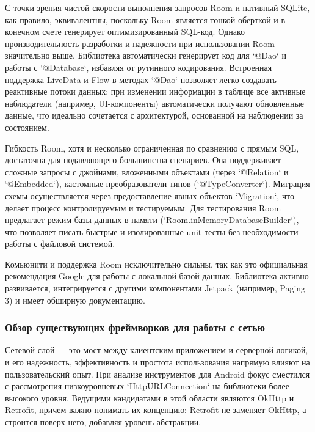 С точки зрения чистой скорости выполнения запросов Room и нативный SQLite, как правило, эквивалентны, поскольку Room является тонкой оберткой и в конечном счете генерирует оптимизированный SQL-код. Однако производительность разработки и надежности при использовании Room значительно выше. Библиотека автоматически генерирует код для `@Dao` и работы с `@Database`, избавляя от рутинного кодирования. Встроенная поддержка LiveData и Flow в методах `@Dao` позволяет легко создавать реактивные потоки данных: при изменении информации в таблице все активные наблюдатели (например, UI-компоненты) автоматически получают обновленные данные, что идеально сочетается с архитектурой, основанной на наблюдении за состоянием. \cite{reff}

Гибкость Room, хотя и несколько ограниченная по сравнению с прямым SQL, достаточна для подавляющего большинства сценариев. Она поддерживает сложные запросы с джойнами, вложенными объектами (через `@Relation` и `@Embedded`), кастомные преобразователи типов (`@TypeConverter`). Миграция схемы осуществляется через предоставление явных объектов `Migration`, что делает процесс контролируемым и тестируемым. Для тестирования Room предлагает режим базы данных в памяти (`Room.inMemoryDatabaseBuilder`), что позволяет писать быстрые и изолированные unit-тесты без необходимости работы с файловой системой. \cite{reff}

Комьюнити и поддержка Room исключительно сильны, так как это официальная рекомендация Google для работы с локальной базой данных. Библиотека активно развивается, интегрируется с другими компонентами Jetpack (например, Paging 3) и имеет обширную документацию.

\subsubsection{Обзор существующих фреймворков для работы с сетью}

Сетевой слой — это мост между клиентским приложением и серверной логикой, и его надежность, эффективность и простота использования напрямую влияют на пользовательский опыт. При анализе инструментов для Android фокус сместился с рассмотрения низкоуровневых `HttpURLConnection` на библиотеки более высокого уровня. Ведущими кандидатами в этой области являются OkHttp и Retrofit, причем важно понимать их концепцию: Retrofit не заменяет OkHttp, а строится поверх него, добавляя уровень абстракции. \cite{refg}

